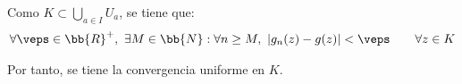 \documentclass[12pt]{article}
\begin{document}
\begin{ejercicio}
\begin{description}
            Como $K\subset \bigcup\limits_{a\in I} U_a$, se tiene que:
            \begin{align*}
                \forall \veps\in \bb{R}^+,\ \exists M\in \bb{N} : \forall n\geq M,\ |g_n(z)-g(z)|<\veps\qquad \forall z\in K
            \end{align*}

            Por tanto, se tiene la convergencia uniforme en $K$.
        \end{description}
    \end{ejercicio}
\end{document}
